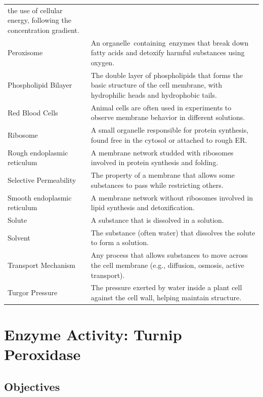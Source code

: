 \documentclass[
  letterpaper,
  DIV=11,
  numbers=noendperiod]{scrreprt}
\begin{document}
{\begin{longtable}[]{@{}
  >{\raggedright\arraybackslash}p{}
  >{\raggedright\arraybackslash}p{}@{}}
the use of cellular energy, following the concentration gradient. \\
Peroxisome~ & An organelle~containing~enzymes that break down fatty
acids and detoxify harmful substances using oxygen.~ \\
Phospholipid Bilayer & The double layer of phospholipids that forms the
basic structure of the cell membrane, with hydrophilic heads and
hydrophobic tails. \\
Red Blood Cells & Animal cells are often used in experiments to observe
membrane behavior in different solutions. \\
Ribosome~ & A small organelle responsible for protein synthesis, found
free in the cytosol or attached to rough ER.~ \\
Rough endoplasmic reticulum~ & A membrane network studded with ribosomes
involved in protein synthesis and folding.~ \\
Selective Permeability & The property of a membrane that allows some
substances to pass while restricting others. \\
Smooth endoplasmic reticulum~ & A membrane network without ribosomes
involved in lipid synthesis and detoxification.~ \\
Solute & A substance that is dissolved in a solution. \\
Solvent & The substance (often water) that dissolves the solute to form
a solution. \\
Transport Mechanism & Any process that allows substances to move across
the cell membrane (e.g., diffusion, osmosis, active transport). \\
Turgor Pressure & The pressure exerted by water inside a plant cell
against the cell wall, helping maintain structure. \\
\end{longtable}
}


\chapter{\texorpdfstring{\textbf{Enzyme Activity: Turnip
Peroxidase}}{Enzyme Activity: Turnip Peroxidase}}\label{enzyme-activity-turnip-peroxidase}

\section{\texorpdfstring{\textbf{Objectives}}{Objectives}}\label{objectives-1}
\end{document}
